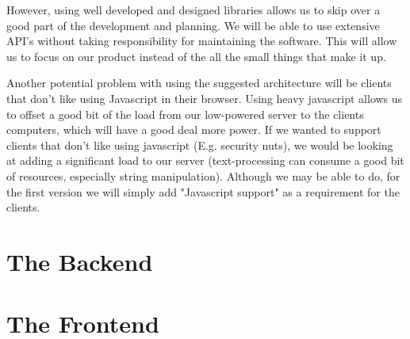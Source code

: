 However, using well developed and designed libraries allows us to skip over a good part of the development and planning.
We will be able to use extensive API's without taking responsibility for maintaining the software.
This will allow us to focus on our product instead of the all the small things that make it up.


Another potential problem with using the suggested architecture will be clients that don't like using Javascript in their browser.
Using heavy javascript allows us to offset a good bit of the load from our low-powered server to the clients computers, which will have a good deal more power.
If we wanted to support clients that don't like using javascript (E.g. security nuts), we would be looking at adding a significant load to our server (text-processing can consume a good bit of resources, especially string manipulation).
Although we may be able to do, for the first version we will simply add "Javascript support" as a requirement for the clients.

\section{The Backend}








\section{The Frontend}









